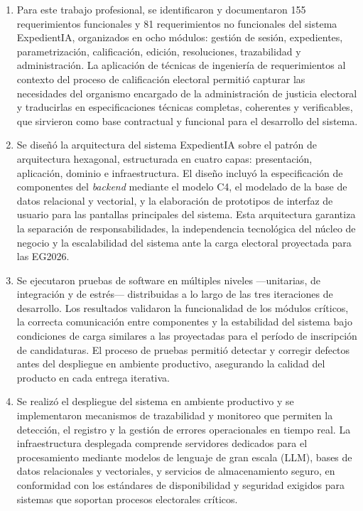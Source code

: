 \documentclass[12pt,a4paper,oneside]{book}
\begin{document}
\begin{enumerate}

    \item Para este trabajo profesional, se identificaron y documentaron 155 requerimientos funcionales y 81 requerimientos no funcionales del sistema ExpedientIA, organizados en ocho módulos: gestión de sesión, expedientes, parametrización, calificación, edición, resoluciones, trazabilidad y administración. La aplicación de técnicas de ingeniería de requerimientos al contexto del proceso de calificación electoral permitió capturar las necesidades del organismo encargado de la administración de justicia electoral y traducirlas en especificaciones técnicas completas, coherentes y verificables, que sirvieron como base contractual y funcional para el desarrollo del sistema.

    \item Se diseñó la arquitectura del sistema ExpedientIA sobre el patrón de arquitectura hexagonal, estructurada en cuatro capas: presentación, aplicación, dominio e infraestructura. El diseño incluyó la especificación de componentes del \textit{backend} mediante el modelo C4, el modelado de la base de datos relacional y vectorial, y la elaboración de prototipos de interfaz de usuario para las pantallas principales del sistema. Esta arquitectura garantiza la separación de responsabilidades, la independencia tecnológica del núcleo de negocio y la escalabilidad del sistema ante la carga electoral proyectada para las EG2026.

    \item Se ejecutaron pruebas de software en múltiples niveles —unitarias, de integración y de estrés— distribuidas a lo largo de las tres iteraciones de desarrollo. Los resultados validaron la funcionalidad de los módulos críticos, la correcta comunicación entre componentes y la estabilidad del sistema bajo condiciones de carga similares a las proyectadas para el período de inscripción de candidaturas. El proceso de pruebas permitió detectar y corregir defectos antes del despliegue en ambiente productivo, asegurando la calidad del producto en cada entrega iterativa.

    \item Se realizó el despliegue del sistema en ambiente productivo y se implementaron mecanismos de trazabilidad y monitoreo que permiten la detección, el registro y la gestión de errores operacionales en tiempo real. La infraestructura desplegada comprende servidores dedicados para el procesamiento mediante modelos de lenguaje de gran escala (LLM), bases de datos relacionales y vectoriales, y servicios de almacenamiento seguro, en conformidad con los estándares de disponibilidad y seguridad exigidos para sistemas que soportan procesos electorales críticos.


\end{enumerate}
\end{document}
